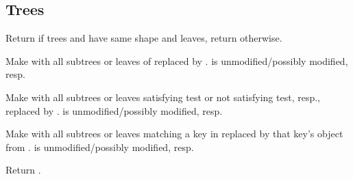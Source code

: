 \subsection{Trees} 
\begin{LIST}{1cm}

  {
  Return \retval{\T} if trees  and  have same
  shape and  leaves, return \retval{\NIL} otherwise.
  }

  {
  Make  with all subtrees or leaves of  replaced by
  .  is unmodified/possibly modified, resp.
  }

  {
  Make  with all subtrees or leaves
  satisfying test or not satisfying test, resp., replaced by
  .  is unmodified/possibly modified, resp.
  }

  {
  Make  with all subtrees or leaves matching
  a key in  replaced by that key's object from . 
   is unmodified/possibly modified, resp.
  }

  {
  Return .
  }

\end{LIST}


